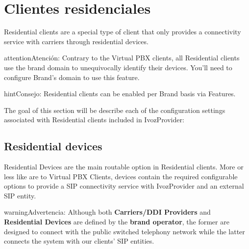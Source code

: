 \documentclass[letterpaper,10pt,spanish]{sphinxmanual}
\begin{document}
\section{Clientes residenciales}
\label{administration_portal/client/residential/index:residential-clients}\label{administration_portal/client/residential/index::doc}
Residential clients are a special type of client that only provides a connectivity
service with carriers through residential devices.

\begin{notice}{attention}{Atención:}
Contrary to the Virtual PBX clients, all Residential clients use the
brand domain to unequivocally identify their devices. You'll need to configure
Brand's domain to use this feature.
\end{notice}

\begin{notice}{hint}{Consejo:}
Residential clients can be enabled per Brand basis via Features.
\end{notice}

The goal of this section will be describe each of the configuration settings
associated with Residential clients included in IvozProvider:


\subsection{Residential devices}
\label{administration_portal/client/residential/residential_devices:id1}\label{administration_portal/client/residential/residential_devices::doc}\label{administration_portal/client/residential/residential_devices:residential-devices}
Residential Devices are the main routable option in Residential clients.
More or less like {\hyperref[administration_portal/client/vpbx/routing_endpoints/friends/index:friends]{}} are to Virtual PBX Clients, devices
contain the required configurable options to provide a SIP connectivity
service with IvozProvider and an external SIP entity.

\begin{notice}{warning}{Advertencia:}
Although both \textbf{Carriers/DDI Providers} and \textbf{Residential Devices} are defined by the
\textbf{brand operator}, the former are designed to connect with the public switched telephony network
while the latter connects the system with our clients' SIP entities.
\end{notice}
\end{document}
